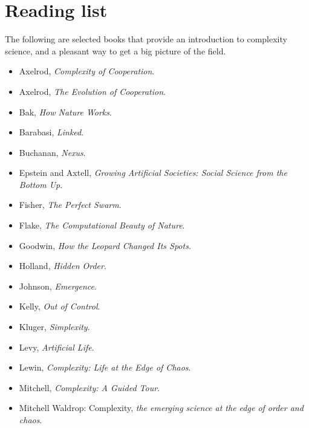 \documentclass[12pt]{book}
\theoremstyle{exercise}
\begin{document}
\chapter{Reading list}
\label{reading}

The following are selected books that provide an introduction to
complexity science, and a pleasant way to get a big picture
of the field.

\begin{itemize}

\item Axelrod, {\it  Complexity of Cooperation}.

\item Axelrod, {\it  The Evolution of Cooperation}.

\item Bak, {\it  How Nature Works}.

\item Barabasi, {\it  Linked}.

\item Buchanan, {\it  Nexus}.

\item Epstein and Axtell, {\it  Growing Artificial Societies: Social Science from the Bottom Up}.

\item Fisher, {\it  The Perfect Swarm}.

\item Flake, {\it  The Computational Beauty of Nature}.

\item Goodwin, {\it  How the Leopard Changed Its Spots}.

\item Holland, {\it  Hidden Order}.

\item Johnson, {\it  Emergence}.

\item Kelly, {\it  Out of Control}.

\item Kluger, {\it  Simplexity}.

\item Levy, {\it  Artificial Life}.

\item Lewin, {\it  Complexity: Life at the Edge of Chaos}.

\item Mitchell, {\it  Complexity: A Guided Tour}.

\item Mitchell Waldrop: Complexity, {\it  the emerging science at the edge of order and chaos}.


\end{itemize}
\end{document}
